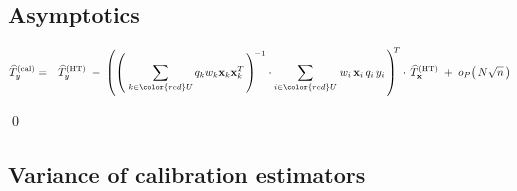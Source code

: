 
\vskip 0.5cm
\subsection{Asymptotics}


\begin{lemma}
\begin{eqnarray*}
\widehat{T}_{y}^{\textnormal{(cal)}}
& = &
    \widehat{T}^{\textnormal{(HT)}}_{y}
    \; - \;
    \left(
        \left(\;
            \underset{k \in {\color{red}U}}{\sum}\,q_{k}w_{k}\mathbf{x}_{k}\mathbf{x}_{k}^{T}
            \,\right)^{\!-1}
        \cdot
        \underset{i \in {\color{red}U}}{\sum}\;
        w_{i}\,\mathbf{x}_{i}\,q_{i}\,y_{i}
        \,\right)^{\!\!T}
    \cdot\,
    \widehat{T}_{\mathbf{x}}^{\textnormal{(HT)}}
    \; + \;
    o_{P}\!\left(\,N\sqrt{n}\,\right)
\end{eqnarray*}
\end{lemma}
\proof

\qed


\vskip 0.5cm
\subsection{Variance of calibration estimators}


